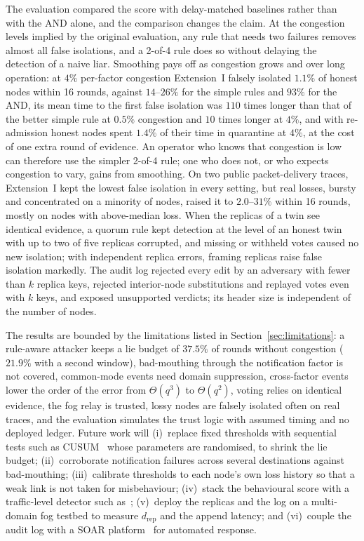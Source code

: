 \documentclass[lineno,pdflatex,sn-nature]{sn-jnl}
\theoremstyle{thmstyleone}%
\theoremstyle{thmstylethree}%
\begin{document}
The evaluation compared the score with delay-matched baselines rather
than with the AND alone, and the comparison changes the claim.  At the
congestion levels implied by the original evaluation, any rule that
needs two failures removes almost all false isolations, and a
2-of-4 rule does so without delaying the detection of a naive liar.  Smoothing pays off as
congestion grows and over long operation: at $4\%$ per-factor
congestion Extension~I falsely isolated $1.1\%$ of honest nodes within
16 rounds, against $14$--$26\%$ for the simple rules and $93\%$ for the
AND, its mean time to the first false isolation was $110$ times longer
than that of the better simple rule at $0.5\%$ congestion and $10$
times longer at $4\%$, and with re-admission honest nodes spent
$1.4\%$ of their time in quarantine at $4\%$,
at the cost of one extra round of evidence.  An operator who knows
that congestion is low can therefore use the simpler 2-of-4 rule; one
who does not, or who expects congestion to vary, gains from
smoothing.  On two public packet-delivery traces, Extension~I kept the
lowest false isolation in every setting, but real losses, bursty and
concentrated on a minority of nodes, raised it to $2.0$--$31\%$ within
16 rounds, mostly on nodes with above-median loss.  When the replicas of a twin see identical evidence, a quorum rule
kept detection at the level of an honest twin with up to two of five
replicas corrupted, and missing or withheld votes caused no new
isolation; with independent replica errors, framing replicas raise
false isolation markedly.  The audit log rejected every edit by an
adversary with fewer than $k$ replica keys, rejected interior-node
substitutions and replayed votes even with $k$ keys, and exposed
unsupported verdicts; its header size is independent of the number of
nodes.

The results are bounded by the limitations listed in
Section~\ref{sec:limitations}: a rule-aware attacker keeps a lie budget
of $37.5\%$ of rounds without congestion ($21.9\%$ with a second
window), bad-mouthing through the notification factor is not covered,
common-mode events need domain suppression, cross-factor events lower
the order of the error from $\Theta(q^{3})$ to $\Theta(q^{2})$,
voting relies on identical evidence, the fog relay is trusted, lossy
nodes are falsely isolated often on real traces, and the evaluation
simulates the trust logic with assumed timing and no deployed ledger.  Future work will
(i)~replace fixed thresholds with sequential tests such as
CUSUM~\cite{page1954continuous} whose parameters are randomised, to
shrink the lie budget; (ii)~corroborate notification failures across
several destinations against bad-mouthing; (iii)~calibrate thresholds to each node's own loss history so that
a weak link is not taken for misbehaviour; (iv)~stack the behavioural
score with a traffic-level detector such
as~\cite{meidan2018nbaiot}; (v)~deploy the replicas and the log on a
multi-domain fog testbed to measure $d_{\mathrm{rep}}$ and the append
latency; and (vi)~couple the audit log with a SOAR
platform~\cite{empl2022soar4iot} for automated response.
\end{document}
